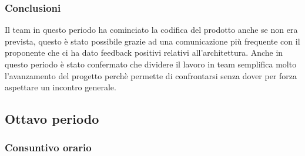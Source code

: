 \subsubsection{Conclusioni}
Il team in questo periodo ha cominciato la codifica del prodotto anche se non era prevista, questo è stato possibile grazie ad una comunicazione più frequente con il proponente che ci ha dato feedback positivi relativi all'architettura. Anche in questo periodo è stato confermato che dividere il lavoro in team semplifica molto l'avanzamento del progetto perchè permette di confrontarsi senza dover per forza aspettare un incontro generale.


\subsection{Ottavo periodo}
\subsubsection{Consuntivo orario}
